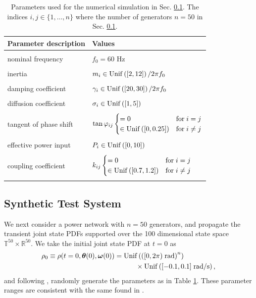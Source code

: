 \documentclass[10pt,twocolumn]{IEEEtran}
\begin{document}
\begin{table}[t]
\centering
\begin{tabular}{| l | l |} 
\hline
Parameter description & Values\\
\hline\hline
&\\
nominal frequency & $f_{0} = 60$ Hz\\
&\\
inertia & $m_{i}\in{\rm{Unif}}\left([2,12]\right)/2\pi f_{0}$\\
& \\
damping coefficient & $\gamma_{i}\in{\rm{Unif}}\left([20,30]\right)/2\pi f_{0}$\\
& \\
diffusion coefficient & $\sigma_{i}\in{\rm{Unif}}\left([1,5]\right)$\\
& \\
tangent of phase shift & $\tan\varphi_{ij}\begin{cases}
=0 & \text{for}\; i=j\\
\in{\rm{Unif}}\left([0,0.25]\right)& \text{for}\; i\neq j
\end{cases}$\\
& \\
effective power input & $P_{i}\in{\rm{Unif}}\left([0,10]\right)$\\
& \\
coupling coefficient & $k_{ij}\begin{cases}
=0 & \text{for}\; i=j\\
\in{\rm{Unif}}\left([0.7,1.2]\right) & \text{for}\; i\neq j	
\end{cases}$\\
& \\
\hline
\end{tabular}
\caption{Parameters used for the numerical simulation in Sec. \ref{subsec:NumSimSynthetic}. The indices $i,j\in\{1,\hdots,n\}$ where the number of generators $n=50$ in Sec. \ref{subsec:NumSimSynthetic}.}
\label{table:ParamUncertaintiesSynthetic}
\end{table}

\subsection{Synthetic Test System}\label{subsec:NumSimSynthetic}
We next consider a power network with $n=50$ generators, and propagate the transient joint state PDFs supported over the 100 dimensional state space $\mathbb{T}^{50}\times\mathbb{R}^{50}$. We take the initial joint state PDF at $t=0$ as
\begin{align}
\rho_{0}\equiv\rho(t=0,\bm{\theta}(0),\bm{\omega}(0)) = &\;{\rm{Unif}}\left(\left([0,2\pi)\;\text{rad}\right)^{n}\right)\nonumber\\
	&\qquad\times {\rm{Unif}}\left([-0.1,0.1]\;\text{rad/s}\right),
\label{rho0synthetic}	
\end{align}
and following \cite[Sec. 5]{dorfler2012synchronization}, randomly generate the parameters as in Table \ref{table:ParamUncertaintiesSynthetic}. These parameter ranges are consistent with the same found in \cite{sauerpai1998,andersonBook1977,kundurBook1994}.
\end{document}
